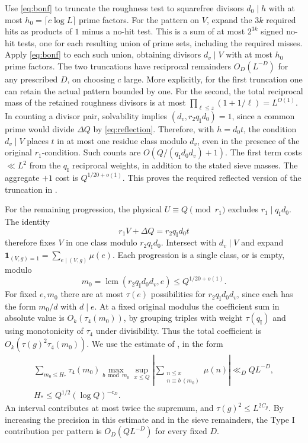 \documentclass[11pt]{amsart}
\numberwithin{equation}{section}
\theoremstyle{remark}
\newcommand{\one}{\mathbf 1}
\begin{document}
Use \eqref{eq:bonf} to truncate the roughness test to squarefree divisors $d_0\mid h$ with at most $h_0=\lceil c\log L\rceil$ prime factors. For the pattern on $V$, expand the $3k$ required hits as products of $1$ minus a no-hit test. This is a sum of at most $2^{3k}$ signed no-hit tests, one for each resulting union of prime sets, including the required misses. Apply \eqref{eq:bonf} to each such union, obtaining divisors $d_v\mid V$ with at most $h_0$ prime factors. The two truncations have reciprocal remainders $O_D(L^{-D})$ for any prescribed $D$, on choosing $c$ large. More explicitly, for the first truncation one can retain the actual pattern bounded by one. For the second, the total reciprocal mass of the retained roughness divisors is at most $\prod_{\ell\le z}(1+1/\ell)=L^{O(1)}$. In counting a divisor pair, solvability implies $(d_v,r_2q_{\mathrm I}d_0)=1$, since a common prime would divide $\Delta Q$ by \eqref{eq:reflection}. Therefore, with $h=d_0 t$, the condition $d_v\mid V$ places $t$ in at most one residue class modulo $d_v$, even in the presence of the original $r_1$-condition. Such counts are $O(Q/(q_{\mathrm I}d_0d_v)+1)$. The first term costs $\ll L^2$ from the $q_{\mathrm I}$ reciprocal weights, in addition to the stated sieve masses. The aggregate $+1$ cost is $Q^{1/20+o(1)}$. This proves the required reflected version of the truncation in \cite[Proposition~5.5]{Lichtman}.

For the remaining progression, the physical $U\equiv Q\pmod{r_1}$ excludes $r_1\mid q_{\mathrm I}d_0$. The identity
\[
 r_1V+\Delta Q=r_2q_{\mathrm I}d_0t
\]
therefore fixes $V$ in one class modulo $r_2q_{\mathrm I}d_0$. Intersect with $d_v\mid V$ and expand $\one_{(V,g)=1}=\sum_{e\mid(V,g)}\mu(e)$. Each progression is a single class, or is empty, modulo
\[
 m_0=\operatorname{lcm}(r_2q_{\mathrm I}d_0d_v,e)\le Q^{1/20+o(1)}.
\]
For fixed $e,m_0$ there are at most $\tau(e)$ possibilities for $r_2q_{\mathrm I}d_0d_v$, since each has the form $m_0/d$ with $d\mid e$. At a fixed original modulus the coefficient sum in absolute value is $O_k(\tau_4(m_0))$, by grouping triples with weight $\tau(q_{\mathrm I})$ and using monotonicity of $\tau_4$ under divisibility. Thus the total coefficient is $O_k(\tau(g)^2\tau_4(m_0))$. We use the estimate of \cite[Lemma~5.4]{Lichtman}, in the form
\[
 \begin{gathered}
 \sum_{m_0\le H_*}\tau_4(m_0)
 \max_{b\bmod m_0}\sup_{x\le Q}
 \left|\sum_{\substack{n\le x\\n\equiv b\ (m_0)}}\mu(n)\right|
 \ll_D QL^{-D},\\
 H_*\le Q^{1/2}(\log Q)^{-c_D}.
 \end{gathered}
\]
An interval contributes at most twice the supremum, and $\tau(g)^2\le L^{2C_g}$. By increasing the precision in this estimate and in the sieve remainders, the Type I contribution per pattern is $O_D(QL^{-D})$ for every fixed $D$.
\end{document}
